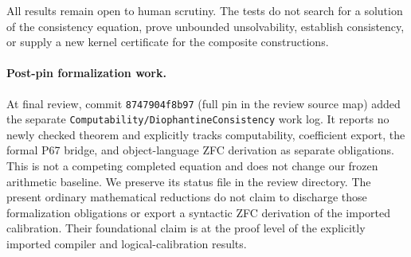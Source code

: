 All results remain open to human scrutiny. The tests do not search for a solution of the consistency equation, prove unbounded unsolvability, establish consistency, or supply a new kernel certificate for the composite constructions.

\paragraph{Post-pin formalization work.}
At final review, commit \texttt{8747904f8b97} (full pin in the review source map) added the separate \texttt{Computability/DiophantineConsistency} work log. It reports no newly checked theorem and explicitly tracks computability, coefficient export, the formal P67 bridge, and object-language ZFC derivation as separate obligations. This is not a competing completed equation and does not change our frozen arithmetic baseline. We preserve its status file in the review directory. The present ordinary mathematical reductions do not claim to discharge those formalization obligations or export a syntactic ZFC derivation of the imported calibration. Their foundational claim is at the proof level of the explicitly imported compiler and logical-calibration results.
